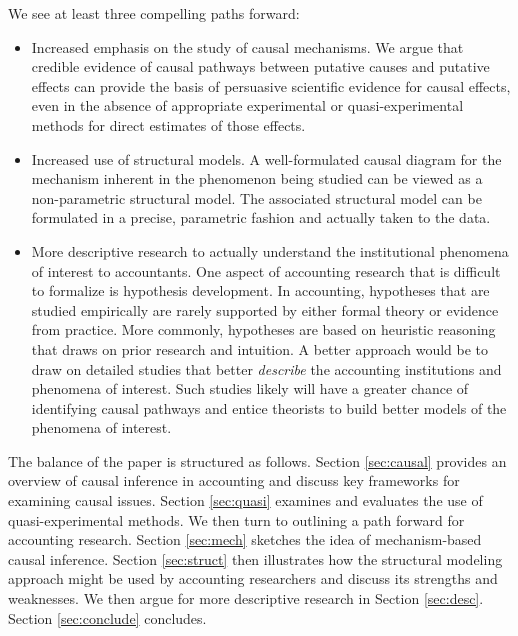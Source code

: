 \documentclass[11pt,reqno,titlepage]{amsart}
\begin{document}
\begin{doublespace}
We see at least three compelling paths forward:
\begin{itemize}
\item Increased emphasis on the study of causal mechanisms. We argue that credible evidence of causal pathways between putative causes and putative effects can provide the basis of persuasive scientific evidence for causal effects, even in the absence of appropriate experimental or quasi-experimental methods for direct estimates of those effects.
\item Increased use of structural models.
	A well-formulated causal diagram for the  mechanism inherent in the phenomenon being studied   can be viewed as a non-parametric structural model.  The associated structural model can be formulated in a precise, parametric fashion and actually taken to the data.
	\item More descriptive research to actually understand the institutional phenomena of interest to accountants.
	One aspect of accounting research that is difficult to formalize is hypothesis development.
	In accounting, hypotheses that are studied empirically are rarely supported by either formal theory or evidence from practice.
	More commonly, hypotheses are based on heuristic reasoning that draws on prior research and intuition.
	A better approach would be to draw on detailed studies that better \emph{describe} the accounting institutions and phenomena of interest.
	Such studies likely will have a greater chance of identifying causal pathways and entice theorists to build better models of the phenomena of interest.
\end{itemize}

The balance of the paper is structured as follows.
Section \ref{sec:causal} provides an overview of causal inference in accounting and discuss key frameworks for examining causal issues.
Section \ref{sec:quasi} examines and evaluates the use of quasi-experimental methods.
We then turn to outlining a path forward for accounting research.
Section \ref{sec:mech} sketches the idea of mechanism-based causal inference.
Section \ref{sec:struct} then illustrates how the structural modeling approach might be used by accounting researchers and discuss its strengths and weaknesses.
We then argue for more descriptive research in Section \ref{sec:desc}.
Section \ref{sec:conclude} concludes.


\end{doublespace}
\end{document}
